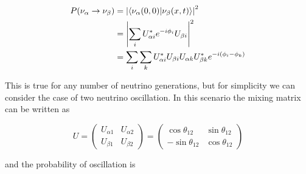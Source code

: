 \begin{equation}	
\begin{split}
	P(\nu_\alpha \rightarrow \nu_\beta) &= \abs{\bra{\nu_\alpha(0,0)}\ket{\nu_\beta(x,t)}}^2 \\
	&=\abs{\sum_{i}U^{*}_{\alpha i}e^{-i\phi_i}U_{\beta i}}^2 \\
	&=\sum_{i}\sum_{k}U^{*}_{\alpha i}U_{\beta i}U_{\alpha k}U^{*}_{\beta k}e^{-i(\phi_{i}-\phi_{k})}
\end{split}
\end{equation}

This is true for any number of neutrino generations, but for simplicity we can consider the case of two neutrino oscillation. In this scenario the mixing matrix can be written as 

\begin{equation}	
U = 
\begin{pmatrix}
U_{\alpha 1} & U_{\alpha 2} \\
U_{\beta 1} & U_{\beta 2}
\end{pmatrix} = 
\begin{pmatrix}
\cos\theta_{12} & \sin\theta_{12} \\
-\sin\theta_{12} & \cos\theta_{12}
\end{pmatrix}
\end{equation}

and the probability of oscillation is

